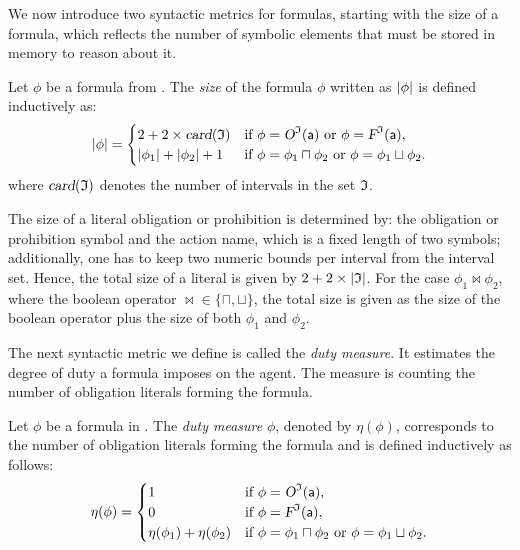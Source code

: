We now introduce two syntactic metrics for formulas, starting with the size of a formula, which reflects the number of symbolic elements that must be stored in memory to reason about it.
\begin{definition}\label{def:size}
Let $\phi$ be a formula from \TDDLfm. The \emph{size} of the formula $\phi$ written as $\vert \phi\vert$ is defined inductively as:
\[
\vert \phi\vert = 
\begin{cases}
2 + 2 \times \textsl{card}(\mathfrak{I}) & \text{if } \phi = \textsl{O}^{\mathfrak{I}}(\mathsf{a}) \text{ or } \phi = \textsl{F}^{\mathfrak{I}}(\mathsf{a}), \\
\vert \phi_1\vert + \vert \phi_2\vert + 1 & \text{if } \phi = \phi_1 \sqcap \phi_2 \text{ or } \phi = \phi_1 \sqcup \phi_2.
\end{cases}
\]
where $\textsl{card}(\mathfrak{I})$ denotes the number of intervals in the set $\mathfrak{I}$.
\end{definition}

The size of a literal obligation or prohibition is determined by: the obligation or prohibition symbol and the action name, which is a fixed length of two symbols; additionally, one has to keep two numeric bounds per interval from the interval set. Hence, the total size of a literal is given by $2 + 2 \times \vert \mathfrak{I}\vert$. For the case $\phi_1\bowtie\phi_2$, where the boolean operator $\bowtie\in \{\sqcap, \sqcup\}$, the total size is given as the size of the boolean operator plus the size of both $\phi_1$ and $\phi_2$.


The next syntactic metric we define is called the \emph{duty measure}. It estimates the degree of duty a formula imposes on the agent. The measure is counting the number of obligation literals forming the formula.
\begin{definition}\label{def:obligation-count}
Let $\phi$ be a formula in \TDDLfm. The \emph{duty measure} $\phi$, denoted by $\eta(\phi)$, corresponds to the number of obligation literals forming the formula and is defined inductively as follows:
\[
\eta(\phi) = 
\begin{cases}
1 & \text{if } \phi = \textsl{O}^{\mathfrak{I}}(\mathsf{a}), \\
0 & \text{if } \phi = \textsl{F}^{\mathfrak{I}}(\mathsf{a}), \\
\eta(\phi_1) + \eta(\phi_2) & \text{if } \phi = \phi_1 \sqcap \phi_2 \text{ or } \phi = \phi_1 \sqcup \phi_2.
\end{cases}
\]
\end{definition}




